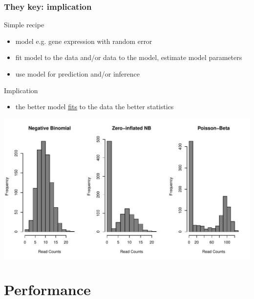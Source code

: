 \documentclass{beamer}\usepackage[]{graphicx}\usepackage[]{color}
\makeatletter
\def\maxwidth{ %
  \ifdim\Gin@nat@width>\linewidth
    \linewidth
  \else
    \Gin@nat@width
  \fi
}
\newenvironment{knitrout}{}{} %
\makeatother
\begin{document}
\begin{frame}
\frametitle{They key: implication}
\begin{block}{Simple recipe}
\begin{itemize}
\item model e.g. gene expression with random error
\item fit model to the data and/or data to the model, estimate model parameters
\item use model for prediction and/or inference
\end{itemize}
\end{block}
\begin{block}{Implication}
\begin{itemize}
\item the better model \href{http://www.itl.nist.gov/div898/handbook/pmd/section4/pmd44.htm}{fits} to the data the better statistics
\end{itemize}
\end{block}
\end{frame}

\begin{frame}
\begin{knitrout}
\color{fgcolor}
\includegraphics[width=\maxwidth]{figure/dist-1} 

\end{knitrout}
\end{frame}

\section{Performance}
\begin{frame}
\begin{center}
\insertsection
\end{center}
\end{frame}
\end{document}
